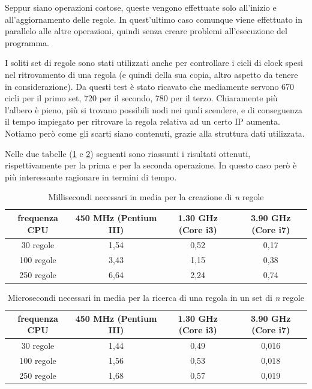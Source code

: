 Seppur siano operazioni costose, queste vengono effettuate solo all'inizio e all'aggiornamento delle regole. In quest'ultimo caso comunque viene effettuato in parallelo alle altre operazioni, quindi senza creare problemi all'esecuzione del programma.

I soliti set di regole sono stati utilizzati anche per controllare i cicli di clock spesi nel ritrovamento di una regola (e quindi della sua copia, altro aspetto da tenere in considerazione). Da questi test è stato ricavato che mediamente servono 670 cicli per il primo set, 720 per il secondo, 780 per il terzo. Chiaramente più l'albero è pieno, più si trovano possibili nodi nei quali scendere, e di conseguenza il tempo impiegato per ritrovare la regola relativa ad un certo IP aumenta. Notiamo però come gli scarti siano contenuti, grazie alla struttura dati utilizzata.

Nelle due tabelle (\ref{perf-cre-rule} e \ref{perf-ret-rule}) seguenti sono riassunti i risultati ottenuti, rispettivamente per la prima e per la seconda operazione. In questo caso però è più interessante ragionare in termini di tempo.

\clearpage
\begin{table}[H]
\begin{center}
\begin{tabular}{|c|c|c|c|}
\hline
frequenza CPU & 450 MHz (Pentium III) & 1.30 GHz (Core i3) & 3.90 GHz (Core i7) \\
\hline
30 regole & 1,54 & 0,52 & 0,17 \\
\hline
100 regole & 3,43 & 1,15 & 0,38 \\
\hline
250 regole & 6,64 & 2,24 & 0,74 \\
\hline
\end{tabular}
\caption{Millisecondi necessari in media per la creazione di \emph{n} regole}
\label{perf-cre-rule}
\end{center}
\end{table}

\begin{table}[H]
\begin{center}
\begin{tabular}{|c|c|c|c|}
\hline
frequenza CPU & 450 MHz (Pentium III) & 1.30 GHz (Core i3) & 3.90 GHz (Core i7) \\
\hline
30 regole & 1,44 & 0,49 & 0,016 \\
\hline
100 regole & 1,56 & 0,53 & 0,018 \\
\hline
250 regole & 1,68 & 0,57 & 0,019 \\
\hline
\end{tabular}
\caption{Microsecondi necessari in media per la ricerca di una regola in un set di \emph{n} regole}
\label{perf-ret-rule}
\end{center}
\end{table}

